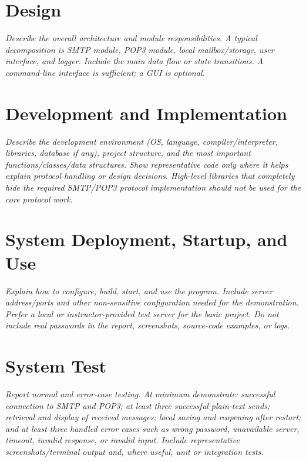 \documentclass[11pt,a4paper]{article}
\newcommand{\prompt}[1]{\textit{#1}}
\begin{document}
\vspace{3em}

\section{Design}
\prompt{Describe the overall architecture and module responsibilities. A typical decomposition is SMTP module, POP3 module, local mailbox/storage, user interface, and logger. Include the main data flow or state transitions. A command-line interface is sufficient; a GUI is optional.}

\vspace{3em}

\section{Development and Implementation}
\prompt{Describe the development environment (OS, language, compiler/interpreter, libraries, database if any), project structure, and the most important functions/classes/data structures. Show representative code only where it helps explain protocol handling or design decisions. High-level libraries that completely hide the required SMTP/POP3 protocol implementation should not be used for the core protocol work.}

\vspace{3em}

\section{System Deployment, Startup, and Use}
\prompt{Explain how to configure, build, start, and use the program. Include server address/ports and other non-sensitive configuration needed for the demonstration. Prefer a local or instructor-provided test server for the basic project. Do not include real passwords in the report, screenshots, source-code examples, or logs.}

\vspace{3em}

\section{System Test}
\prompt{Report normal and error-case testing. At minimum demonstrate: successful connection to SMTP and POP3; at least three successful plain-text sends; retrieval and display of received messages; local saving and reopening after restart; and at least three handled error cases such as wrong password, unavailable server, timeout, invalid response, or invalid input. Include representative screenshots/terminal output and, where useful, unit or integration tests.}
\end{document}
